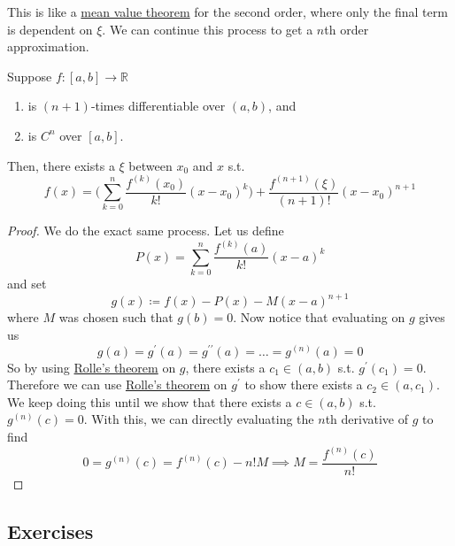   This is like a \hyperref[thm:mvt]{mean value theorem} for the second order, where only the final term is dependent on $\xi$. We can continue this process to get a $n$th order approximation. 

  \begin{theorem}
    \label{thm:taylor-lagrange}
    Suppose $f: [a, b] \to \mathbb{R}$
    \begin{enumerate}
      \item is $(n+1)$-times differentiable over $(a, b)$, and 
      \item is $C^{n}$ over $[a, b]$. 
    \end{enumerate}
    Then, there exists a $\xi$ between $x_0$ and $x$ s.t. 
    \begin{equation}
      f(x) = \bigg( \sum_{k=0}^n \frac{f^{(k)}(x_0)}{k!} (x - x_0)^k  \bigg) + \frac{f^{(n+1)} (\xi)}{(n+1)!} (x - x_0)^{n+1}
    \end{equation} 
  \end{theorem}
  \begin{proof}
    We do the exact same process. Let us define 
    \begin{equation}
      P(x) = \sum_{k=0}^n \frac{f^{(k)} (a)}{k!} (x - a)^k
    \end{equation} 
    and set 
    \begin{equation}
      g(x) \coloneqq f(x) - P(x) - M (x - a)^{n+1}
    \end{equation} 
    where $M$ was chosen such that $g(b) = 0$. Now notice that evaluating on $g$ gives us 
    \begin{equation}
      g(a) = g^\prime (a) = g^{\prime\prime} (a) = \ldots = g^{(n)} (a) = 0 
    \end{equation} 
    So by using \hyperref[thm:rolle]{Rolle's theorem} on $g$, there exists a $c_1 \in (a, b)$ s.t. $g^\prime (c_1) = 0$. Therefore we can use \hyperref[thm:rolle]{Rolle's theorem} on $g^\prime$ to show there exists a $c_2 \in (a, c_1)$. We keep doing this until we show that there exists a $c \in (a, b)$ s.t. $g^{(n)} (c) = 0$. With this, we can directly evaluating the $n$th derivative of $g$ to find 
    \begin{equation}
      0 = g^{(n)} (c) = f^{(n)} (c) - n! M \implies M = \frac{f^{(n)} (c)}{n!}
    \end{equation}
  \end{proof}

\subsection{Exercises}

